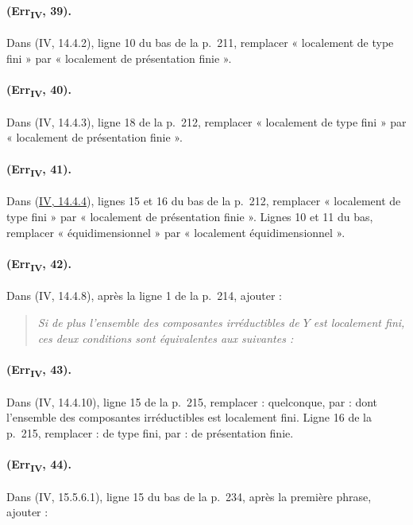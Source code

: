 \paragraph{(Err\textsubscript{IV}, 39).}
Dans (IV, 14.4.2), ligne 10 du bas de la p.~211, remplacer « localement
de type fini » par « localement de présentation finie ».

\paragraph{(Err\textsubscript{IV}, 40).}
Dans (IV, 14.4.3), ligne 18 de la p.~212, remplacer « localement de
type fini » par « localement de présentation finie ».

\paragraph{(Err\textsubscript{IV}, 41).}
Dans ({\hyperref[canon-index.ega4.c04.cor.14-4-4]{IV, 14.4.4}}), lignes 15 et 16 du
bas de la p.~212, remplacer « localement de type fini » par
« localement de présentation finie ». Lignes 10 et 11 du bas, remplacer
« équidimensionnel » par « localement équidimensionnel ».

\paragraph{(Err\textsubscript{IV}, 42).}
Dans (IV, 14.4.8), après la ligne 1 de la p.~214, ajouter :
\begin{quote}
\emph{Si de plus l'ensemble des composantes irréductibles de $Y$ est
localement fini, ces deux conditions sont équivalentes aux suivantes :}
\end{quote}

\paragraph{(Err\textsubscript{IV}, 43).}
Dans (IV, 14.4.10), ligne 15 de la p.~215, remplacer : quelconque, par :
dont l'ensemble des composantes irréductibles est localement fini.
Ligne 16 de la p.~215, remplacer : de type fini, par : de présentation
finie.

\paragraph{(Err\textsubscript{IV}, 44).}
Dans (IV, 15.5.6.1), ligne 15 du bas de la p.~234, après la première
phrase, ajouter :

